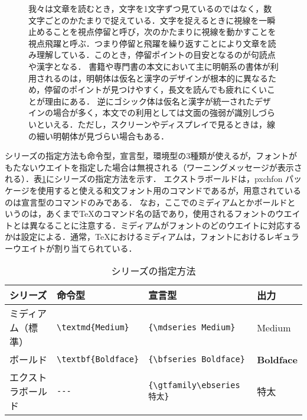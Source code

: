 \begin{figure}[b]
\begin{itembox}[l]{}
\small\sffamily\mgfamily
我々は文章を読むとき，文字を1文字ずつ見ているのではなく，数文字ごとのかたまりで捉えている．文字を捉えるときに視線を一瞬止めることを視点停留と呼び，次のかたまりに視線を動かすことを視点飛躍と呼ぶ．つまり停留と飛躍を繰り返すことにより文章を読み理解している．このとき，停留ポイントの目安となるのが句読点や漢字となる．
書籍や専門書の本文において主に明朝系の書体が利用されるのは，明朝体は仮名と漢字のデザインが根本的に異なるため，停留のポイントが見つけやすく，長文を読んでも疲れにくいことが理由にある．
逆にゴシック体は仮名と漢字が統一されたデザインの場合が多く，本文での利用としては文面の強弱が識別しづらいといえる．ただし，スクリーンやディスプレイで見るときは，線の細い明朝体が見づらい場合もある．
\end{itembox}
\end{figure}

シリーズの指定方法も命令型，宣言型，環境型の3種類が使えるが，フォントがもたないウエイトを指定した場合は無視される（ワーニングメッセージが表示される）．表\ref{seri}にシリーズの指定方法を示す．
エクストラボールドは，pxchfon パッケージを使用すると使える和文フォント用のコマンドであるが，用意されているのは宣言型のコマンドのみである．
なお，ここでのミディアムとかボールドというのは，あくまで{\TeX}のコマンド名の話であり，使用されるフォントのウエイトとは異なることに注意する．ミディアムがフォントのどのウエイトに対応するかは設定による．通常，{\TeX}におけるミディアムは，フォントにおけるレギュラーウエイトが割り当てられている．
\begin{table}[t]
\caption{シリーズの指定方法}
\label{seri}
\centering
\begin{tabular}{l||l|l|l}\hline
シリーズ & 命令型 & 宣言型 & 出力\\ \hline
ミディアム（標準）&\verb|\textmd{Medium}|& \verb|{\mdseries Medium}| &\textmd{\textrm{Medium}}\\
ボールド&\verb|\textbf{Boldface}| & \verb|{\bfseries Boldface}| & \textbf{\textrm{Boldface}}\\
エクストラボールド&\verb|---| & \verb|{\gtfamily\ebseries 特太}| & {\gtfamily\ebseries 特太}\\ \hline
\end{tabular}
\end{table}

